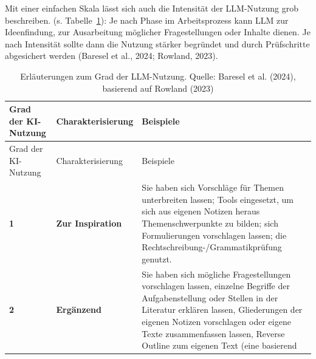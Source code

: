 \documentclass[
  ngerman,
  letterpaper,
  DIV=11]{scrreprt}
\begin{document}
Mit einer einfachen Skala lässt sich auch die Intensität der LLM-Nutzung
grob beschreiben. (s. Tabelle~\ref{tbl-llm-scale}): Je nach Phase im
Arbeitsprozess kann LLM zur Ideenfindung, zur Ausarbeitung möglicher
Fragestellungen oder Inhalte dienen. Je nach Intensität sollte dann die
Nutzung stärker begründet und durch Prüfschritte abgesichert werden
(Baresel et al., 2024; Rowland, 2023).

\begin{longtable}[]{@{}
  >{\raggedright\arraybackslash}p{}
  >{\raggedright\arraybackslash}p{}
  >{\raggedright\arraybackslash}p{}@{}}
\caption{Erläuterungen zum Grad der LLM-Nutzung. Quelle: Baresel et al.
(2024), basierend auf Rowland
(2023)}\label{tbl-llm-scale}\tabularnewline
\toprule\noalign{}
\begin{minipage}[b]{\linewidth}\raggedright
Grad der KI-Nutzung
\end{minipage} & \begin{minipage}[b]{\linewidth}\raggedright
Charakterisierung
\end{minipage} & \begin{minipage}[b]{\linewidth}\raggedright
Beispiele
\end{minipage} \\
\midrule\noalign{}
\endfirsthead
\toprule\noalign{}
\begin{minipage}[b]{\linewidth}\raggedright
Grad der KI-Nutzung
\end{minipage} & \begin{minipage}[b]{\linewidth}\raggedright
Charakterisierung
\end{minipage} & \begin{minipage}[b]{\linewidth}\raggedright
Beispiele
\end{minipage} \\
\midrule\noalign{}
\endhead
\bottomrule\noalign{}
\endlastfoot
\textbf{1} & \textbf{Zur Inspiration} & Sie haben sich Vorschläge für
Themen unterbreiten lassen; Tools eingesetzt, um sich aus eigenen
Notizen heraus Themenschwerpunkte zu bilden; sich Formulierungen
vorschlagen lassen; die Rechtschreibung-/Grammatikprüfung genutzt. \\
\textbf{2} & \textbf{Ergänzend} & Sie haben sich mögliche
Fragestellungen vorschlagen lassen, einzelne Begriffe der
Aufgabenstellung oder Stellen in der Literatur erklären lassen,
Gliederungen der eigenen Notizen vorschlagen oder eigene Texte
zusammenfassen lassen, Reverse Outline zum eigenen Text (eine basierend

\end{longtable}
\end{document}
